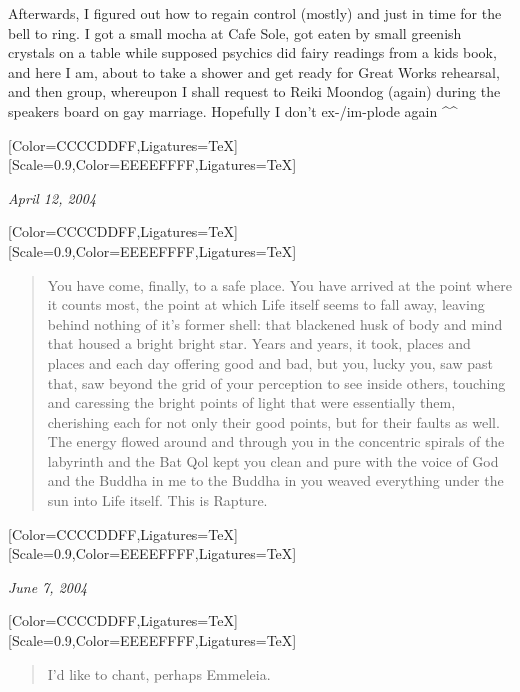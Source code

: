 \begin{paracol}{2}
\begin{leftcolumn}
Afterwards, I figured out how to regain control (mostly) and just in time for the bell to ring. I got a small mocha at Cafe Sole, got eaten by small greenish crystals on a table while supposed psychics did fairy readings from a kids book, and here I am, about to take a shower and get ready for Great Works rehearsal, and then group, whereupon I shall request to Reiki Moondog (again) during the speakers board on gay marriage. Hopefully I don't ex-/im-plode again \^{}\^{}
\newpage
\end{leftcolumn}
\begin{rightcolumn*}
  [Color=CCCCDDFF,Ligatures=TeX]
  \renewfontfamily{}[Scale=0.9,Color=EEEEFFFF,Ligatures=TeX]
\begin{flushright}
    \emph{April 12, 2004}
\end{flushright}
\end{rightcolumn*}
\begin{leftcolumn}
  [Color=CCCCDDFF,Ligatures=TeX]
  \renewfontfamily{}[Scale=0.9,Color=EEEEFFFF,Ligatures=TeX]
\begin{quotation}
\noindent You have come, finally, to a safe place. You have arrived at the point where it counts most, the point at which Life itself seems to fall away, leaving behind nothing of it's former shell: that blackened husk of body and mind that housed a bright bright star. Years and years, it took, places and places and each day offering good and bad, but you, lucky you, saw past that, saw beyond the grid of your perception to see inside others, touching and caressing the bright points of light that were essentially them, cherishing each for not only their good points, but for their faults as well. The energy flowed around and through you in the concentric spirals of the labyrinth and the Bat Qol kept you clean and pure with the voice of God and the Buddha in me to the Buddha in you weaved everything under the sun into Life itself. This is Rapture.
\end{quotation}
\newpage
\end{leftcolumn}
\begin{rightcolumn*}
  [Color=CCCCDDFF,Ligatures=TeX]
  \renewfontfamily{}[Scale=0.9,Color=EEEEFFFF,Ligatures=TeX]
\begin{flushright}
    \emph{June 7, 2004}
\end{flushright}
\end{rightcolumn*}
\begin{leftcolumn}
  [Color=CCCCDDFF,Ligatures=TeX]
  \renewfontfamily{}[Scale=0.9,Color=EEEEFFFF,Ligatures=TeX]
\begin{quotation}
\noindent I'd like to chant, perhaps Emmeleia.


\end{quotation}
\end{leftcolumn}
\end{paracol}
